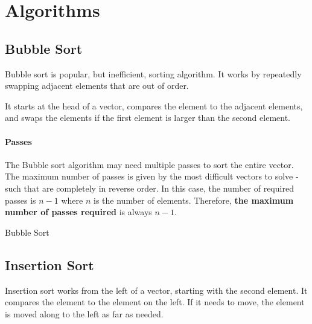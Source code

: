\section{Algorithms}

\subsection{Bubble Sort}
Bubble sort is popular, but inefficient, sorting algorithm. It works by repeatedly swapping adjacent elements that are out of order.

It starts at the head of a vector, compares the element to the adjacent elements, and swaps the elements if the first element is larger than the second element.

\paragraph{Passes} The Bubble sort algorithm may need multiple passes to sort the entire vector. The maximum number of passes is given by the most difficult vectors to solve - such that are completely in reverse order. In this case, the number of required passes is \( n-1 \) where \( n \) is the number of elements. Therefore, \textbf{the maximum number of passes required} is always \( n-1 \).  

\begin{algorithm}[H]
	\caption{Bubble Sort}\label{alg:bubble}
	\begin{algorithmic}
		\EndIf{}
		\EndFor{}
		\EndIf{}
		\EndFor{}
		\EndFunction{}
	\end{algorithmic}
\end{algorithm}


\subsection{Insertion Sort}
Insertion sort works from the left of a vector, starting with the second element. It compares the element to the element on the left. If it needs to move, the element is moved along to the left as far as needed.


